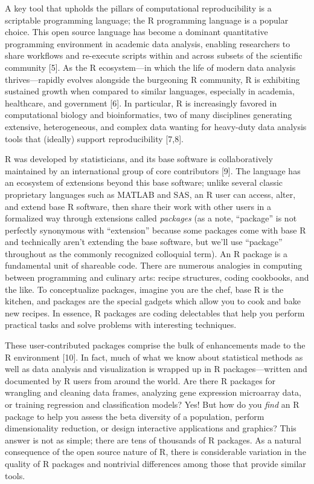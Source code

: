 \documentclass[10pt,letterpaper]{article}
\begin{document}
A key tool that upholds the pillars of computational reproducibility is
a scriptable programming language; the R programming language is a
popular choice. This open source language has become a dominant
quantitative programming environment in academic data analysis, enabling
researchers to share workflows and re-execute scripts within and across
subsets of the scientific community {[}5{]}. As the R ecosystem---in
which the life of modern data analysis thrives---rapidly evolves
alongside the burgeoning R community, R is exhibiting sustained growth
when compared to similar languages, especially in academia, healthcare,
and government {[}6{]}. In particular, R is increasingly favored in
computational biology and bioinformatics, two of many disciplines
generating extensive, heterogeneous, and complex data wanting for
heavy-duty data analysis tools that (ideally) support reproducibility
{[}7,8{]}.

R was developed by statisticians, and its base software is
collaboratively maintained by an international group of core
contributors {[}9{]}. The language has an ecosystem of extensions beyond
this base software; unlike several classic proprietary languages such as
MATLAB and SAS, an R user can access, alter, and extend base R software,
then share their work with other users in a formalized way through
extensions called \emph{packages} (as a note, ``package'' is not
perfectly synonymous with ``extension'' because some packages come with
base R and technically aren't extending the base software, but we'll use
``package'' throughout as the commonly recognized colloquial term). An R
package is a fundamental unit of shareable code. There are numerous
analogies in computing between programming and culinary arts: recipe
structures, coding cookbooks, and the like. To conceptualize packages,
imagine you are the chef, base R is the kitchen, and packages are the
special gadgets which allow you to cook and bake new recipes. In
essence, R packages are coding delectables that help you perform
practical tasks and solve problems with interesting techniques.

These user-contributed packages comprise the bulk of enhancements made
to the R environment {[}10{]}. In fact, much of what we know about
statistical methods as well as data analysis and visualization is
wrapped up in R packages---written and documented by R users from around
the world. Are there R packages for wrangling and cleaning data frames,
analyzing gene expression microarray data, or training regression and
classification models? Yes! But how do you \emph{find} an R package to
help you assess the beta diversity of a population, perform
dimensionality reduction, or design interactive applications and
graphics? This answer is not as simple; there are tens of thousands of R
packages. As a natural consequence of the open source nature of R, there
is considerable variation in the quality of R packages and nontrivial
differences among those that provide similar tools.
\end{document}
